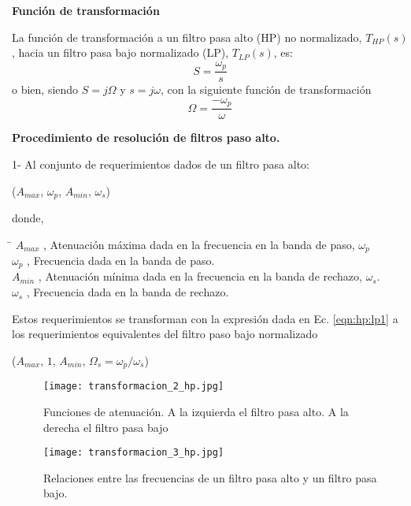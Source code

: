 \documentclass[informe.tex]{subfiles}
\begin{document}
\textbf{Función de transformación}\newline

La función de transformación a un filtro pasa alto (HP) no normalizado, $T_{HP}(s)$, hacia un filtro pasa bajo normalizado (LP), $T_{LP}(s)$, es:
	\begin{equation}
		\label{eqn:hp:lp1}	
		S=\frac{\omega_p}{s}
	\end{equation}
o bien, siendo $S=j\Omega$ y $s=j\omega$, con la siguiente función de transformación
	\begin{equation}
		\label{eqn:hp:lp2}	
		\Omega=\frac{-\omega_p}{\omega}
	\end{equation}\newline
		
\textbf{Procedimiento de resolución de filtros paso alto.}\newline

1- Al conjunto de requerimientos dados de un filtro pasa alto:
	\begin{center}			 
				($A_{max}$, $\omega_p$, $A_{min}$, $\omega_s$)
	\end{center}
	donde,
	\begin{tabbing}
		\= \kill
		$A_{max}$\> , Atenuación máxima dada en la frecuencia en la banda de paso, $\omega_p$ \\
		$\omega_p$\> , Frecuencia dada en la banda de paso.\\
		$A_{min}$\> , Atenuación mínima dada en la frecuencia en la banda de rechazo, $\omega_s$. \\
		$\omega_s$\> , Frecuencia dada en la banda de rechazo.				
	\end{tabbing}
	
	
Estos requerimientos se transforman con la expresión dada en Ec. \ref{eqn:hp:lp1} 	a los requerimientos equivalentes del filtro paso bajo normalizado
    \begin{center}
				($A_{max}$, $1$, $A_{min}$, $\Omega_s=\omega_p/\omega_s$)
    \end{center}				
	
		\begin{figure}[h]
		\centering
		\texttt{[image: transformacion\_2\_hp.jpg]}
		\caption{Funciones de atenuación. A la izquierda el filtro pasa alto. A la derecha el filtro pasa bajo}
		\label{fig:transformacion:hp:func_att}
		\end{figure}	
		
		\begin{figure}[h]
		\centering
		\texttt{[image: transformacion\_3\_hp.jpg]}
		\caption{Relaciones entre las frecuencias de un filtro pasa alto y un filtro pasa bajo.}
		\label{fig:transformacion:hp:relaciones}
		\end{figure}	
			
\end{document}
